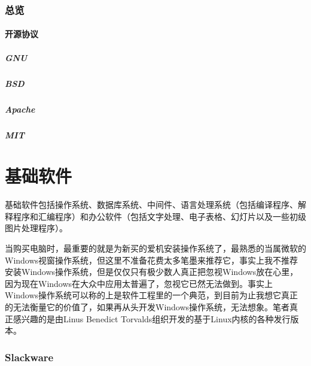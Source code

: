 \documentclass{book}
\begin{document}
\newpage
\section{总览}

\subsection{开源协议}

\subsubsection{GNU}

\subsubsection{BSD}

\subsubsection{Apache}

\subsubsection{MIT}

\clearpage

\part{基础软件}

基础软件包括操作系统、数据库系统、中间件、语言处理系统（包括编译程序、解释程序和汇编程序）和办公软件（包括文字处理、电子表格、幻灯片以及一些初级图片处理程序）。
	
\clearpage

当购买电脑时，最重要的就是为新买的爱机安装操作系统了，最熟悉的当属微软的Windows视窗操作系统，但这里不准备花费太多笔墨来推荐它，事实上我不推荐安装Windows操作系统，但是仅仅只有极少数人真正把忽视Windows放在心里，因为现在Windows在大众中应用太普遍了，忽视它已然无法做到。事实上Windows操作系统可以称的上是软件工程里的一个典范，到目前为止我想它真正的无法衡量它的价值了，如果再从头开发Windows操作系统，无法想象。笔者真正感兴趣的是由Linus Benedict Torvalds组织开发的基于Linux内核的各种发行版本。

\newpage

\section{Slackware}
\end{document}
